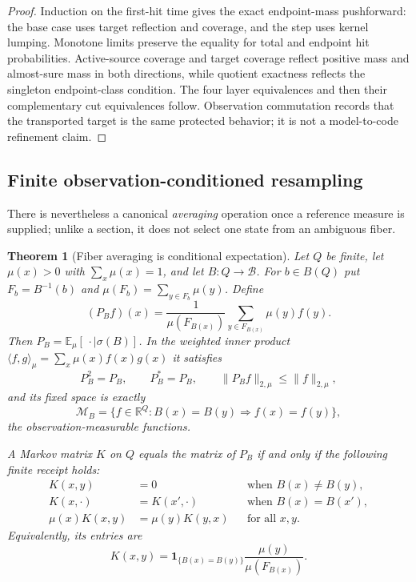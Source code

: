 \documentclass[11pt]{article}
\newtheorem{theorem}{Theorem}[section]
\theoremstyle{definition}
\theoremstyle{remark}
\numberwithin{equation}{section}
\newcommand{\cB}{\mathcal B}
\begin{document}
\begin{proof}
Induction on the first-hit time gives the exact endpoint-mass pushforward:
the base case uses target reflection and coverage, and the step uses kernel
lumping.  Monotone limits preserve the equality for total and endpoint hit
probabilities.  Active-source coverage and target coverage reflect positive
mass and almost-sure mass in both directions, while quotient exactness
reflects the singleton endpoint-class condition.  The four layer equivalences
and then their complementary cut equivalences follow.  Observation
commutation records that the transported target is the same protected
behavior; it is not a model-to-code refinement claim.
\end{proof}

\subsection{Finite observation-conditioned resampling}

There is nevertheless a canonical \emph{averaging} operation once a reference
measure is supplied; unlike a section, it does not select one state from an
ambiguous fiber.

\begin{theorem}[Fiber averaging is conditional expectation]
\label{thm:fiber-conditional-expectation}
Let $Q$ be finite, let $\mu(x)>0$ with $\sum_x\mu(x)=1$, and let
$B:Q\to\cB$.  For $b\in B(Q)$ put
$F_b=B^{-1}(b)$ and $\mu(F_b)=\sum_{y\in F_b}\mu(y)$.  Define
\[
 (P_Bf)(x)
 =\frac{1}{\mu(F_{B(x)})}
   \sum_{y\in F_{B(x)}}\mu(y)f(y).
 \]
Then $P_B=\mathbb E_\mu[\,\cdot\mid\sigma(B)]$.  In the weighted inner
product $\langle f,g\rangle_\mu=\sum_x\mu(x)f(x)g(x)$ it satisfies
\[
 P_B^2=P_B,\qquad P_B^*=P_B,\qquad
 \|P_Bf\|_{2,\mu}\le\|f\|_{2,\mu},
\]
and its fixed space is exactly
\[
 \mathcal M_B=\{f\in\mathbb R^Q:B(x)=B(y)\Rightarrow f(x)=f(y)\},
\]
the observation-measurable functions.

A Markov matrix $K$ on $Q$ equals the matrix of $P_B$ if and only
if the following finite receipt holds:
\begin{align*}
 K(x,y)&=0 &&\text{when }B(x)\ne B(y),\tag{R1}\\
 K(x,\cdot)&=K(x',\cdot)&&\text{when }B(x)=B(x'),\tag{R2}\\
 \mu(x)K(x,y)&=\mu(y)K(y,x)&&\text{for all }x,y.\tag{R3}
\end{align*}
Equivalently, its entries are
\[
 K(x,y)=\mathbf1_{\{B(x)=B(y)\}}
 \frac{\mu(y)}{\mu(F_{B(x)})}.
\]
\end{theorem}
\end{document}
